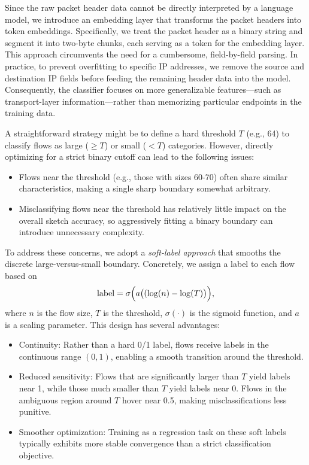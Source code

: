 Since the raw packet header data cannot be directly interpreted by a language model, we introduce an embedding layer that transforms the packet headers into token embeddings. Specifically, we treat the packet header as a binary string and segment it into two-byte chunks, each serving as a token for the embedding layer. This approach circumvents the need for a cumbersome, field-by-field parsing.
% 
In practice, to prevent overfitting to specific IP addresses, we remove the source and destination IP fields before feeding the remaining header data into the model. Consequently, the classifier focuses on more generalizable features—such as transport-layer information—rather than memorizing particular endpoints in the training data.




% 
A straightforward strategy might be to define a hard threshold \( T \) (e.g., 64) to classify flows as large (\( \geqslant T \)) or small (\( < T \)) categories. However, directly optimizing for a strict binary cutoff can lead to the following issues:

\begin{itemize}[leftmargin=*]
    \item Flows near the threshold (e.g., those with sizes 60-70) often share similar characteristics, making a single sharp boundary somewhat arbitrary.

    \item Misclassifying flows near the threshold has relatively little impact on the overall sketch accuracy, so aggressively fitting a binary boundary can introduce unnecessary complexity.
\end{itemize}


To address these concerns, we adopt a \textit{soft-label approach} that smooths the discrete large-versus-small boundary. Concretely, we assign a label to each flow based on
%
\[
\text{label} = \sigma \Bigl(a \bigl((\log(n) - \log(T) \bigr)\Bigr),
\]
%
where \(n\) is the flow size, \(T\) is the threshold, \(\sigma(\cdot)\) is the sigmoid function, and \(a\) is a scaling parameter. This design has several advantages:


\begin{itemize}[leftmargin=*]
\item Continuity: Rather than a hard 0/1 label, flows receive labels in the continuous range \((0, 1)\), enabling a smooth transition around the threshold.

\item Reduced sensitivity: Flows that are significantly larger than \(T\) yield labels near 1, while those much smaller than \(T\) yield labels near 0. Flows in the ambiguous region around \(T\) hover near 0.5, making misclassifications less punitive.

\item Smoother optimization: Training as a regression task on these soft labels typically exhibits more stable convergence than a strict classification objective.
\end{itemize}



